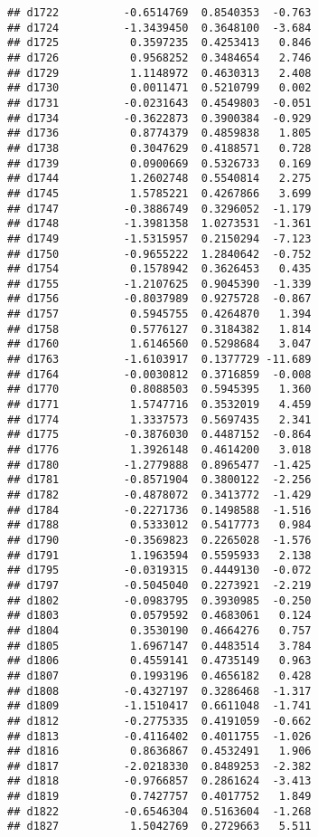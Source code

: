 \documentclass[
]{article}
\begin{document}
\begin{verbatim}
## d1722          -0.6514769  0.8540353  -0.763
## d1724          -1.3439450  0.3648100  -3.684
## d1725           0.3597235  0.4253413   0.846
## d1726           0.9568252  0.3484654   2.746
## d1729           1.1148972  0.4630313   2.408
## d1730           0.0011471  0.5210799   0.002
## d1731          -0.0231643  0.4549803  -0.051
## d1734          -0.3622873  0.3900384  -0.929
## d1736           0.8774379  0.4859838   1.805
## d1738           0.3047629  0.4188571   0.728
## d1739           0.0900669  0.5326733   0.169
## d1744           1.2602748  0.5540814   2.275
## d1745           1.5785221  0.4267866   3.699
## d1747          -0.3886749  0.3296052  -1.179
## d1748          -1.3981358  1.0273531  -1.361
## d1749          -1.5315957  0.2150294  -7.123
## d1750          -0.9655222  1.2840642  -0.752
## d1754           0.1578942  0.3626453   0.435
## d1755          -1.2107625  0.9045390  -1.339
## d1756          -0.8037989  0.9275728  -0.867
## d1757           0.5945755  0.4264870   1.394
## d1758           0.5776127  0.3184382   1.814
## d1760           1.6146560  0.5298684   3.047
## d1763          -1.6103917  0.1377729 -11.689
## d1764          -0.0030812  0.3716859  -0.008
## d1770           0.8088503  0.5945395   1.360
## d1771           1.5747716  0.3532019   4.459
## d1774           1.3337573  0.5697435   2.341
## d1775          -0.3876030  0.4487152  -0.864
## d1776           1.3926148  0.4614200   3.018
## d1780          -1.2779888  0.8965477  -1.425
## d1781          -0.8571904  0.3800122  -2.256
## d1782          -0.4878072  0.3413772  -1.429
## d1784          -0.2271736  0.1498588  -1.516
## d1788           0.5333012  0.5417773   0.984
## d1790          -0.3569823  0.2265028  -1.576
## d1791           1.1963594  0.5595933   2.138
## d1795          -0.0319315  0.4449130  -0.072
## d1797          -0.5045040  0.2273921  -2.219
## d1802          -0.0983795  0.3930985  -0.250
## d1803           0.0579592  0.4683061   0.124
## d1804           0.3530190  0.4664276   0.757
## d1805           1.6967147  0.4483514   3.784
## d1806           0.4559141  0.4735149   0.963
## d1807           0.1993196  0.4656182   0.428
## d1808          -0.4327197  0.3286468  -1.317
## d1809          -1.1510417  0.6611048  -1.741
## d1812          -0.2775335  0.4191059  -0.662
## d1813          -0.4116402  0.4011755  -1.026
## d1816           0.8636867  0.4532491   1.906
## d1817          -2.0218330  0.8489253  -2.382
## d1818          -0.9766857  0.2861624  -3.413
## d1819           0.7427757  0.4017752   1.849
## d1822          -0.6546304  0.5163604  -1.268
## d1827           1.5042769  0.2729663   5.511

\end{verbatim}
\end{document}

